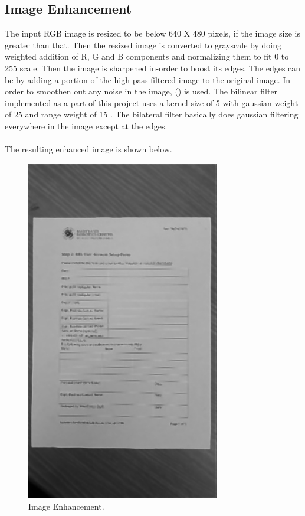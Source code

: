 \subsection{Image Enhancement}

The input RGB image is resized to be below 640 X 480 pixels, if the image size is greater than that. Then the resized image is converted to grayscale by doing weighted addition of R, G and B components and normalizing them to fit 0 to 255 scale. Then the image is sharpened in-order to boost its edges. The edges can be  by adding a portion of the high pass filtered image to the original image. In order to smoothen out any noise in the image,  (\cite{Reference17}) is used. The bilinear filter implemented as a part of this project uses a kernel size of 5 with gaussian weight of 25 and range weight of 15 . The bilateral filter basically does gaussian filtering everywhere in the image except at the edges. \\ \\
 The resulting enhanced image is shown below. \\


\begin{figure}[th]
	\centering
	\includegraphics[height=15cm ]{Figures/image_enhancement}
	\caption[Image Enhancement]{Image Enhancement.}
	\label{fig:ImageEnhancement}
\end{figure}

